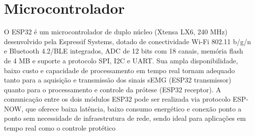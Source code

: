 \section{Microcontrolador}

O ESP32 \cite{esp32_datasheet} é um microcontrolador de duplo núcleo (Xtensa LX6, 240 MHz) desenvolvido pela Espressif Systems, dotado de conectividade Wi-Fi 802.11 b/g/n e Bluetooth 4.2/BLE integrados, ADC de 12 bits com 18 canais, memória flash de 4 MB e suporte a protocolo SPI, I2C e UART. Sua ampla disponibilidade, baixo custo e capacidade de processamento em tempo real tornam adequado tanto para a aquisição e transmissão dos sinais sEMG (ESP32 transmissor) quanto para o processamento e controle da prótese (ESP32 receptor).
A comunicação entre os dois módulos ESP32 pode ser realizada via protocolo ESP-NOW, que oferece baixa latência, baixo consumo energético e conexão ponto a ponto sem necessidade de infraestrutura de rede, sendo ideal para aplicações em tempo real como o controle protético

